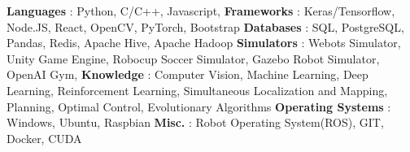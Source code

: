\begin{cventries}  
\skillentry
    {
    \space \textbf{Languages} : Python, C/C++, Javascript, 
    \space \textbf{Frameworks} : Keras/Tensorflow, Node.JS, React, OpenCV, PyTorch, Bootstrap
    \space \textbf{Databases} : SQL, PostgreSQL, Pandas, Redis, Apache Hive, Apache Hadoop
    \space \textbf{Simulators} : Webots Simulator, Unity Game Engine, Robocup Soccer Simulator, Gazebo Robot Simulator, OpenAI Gym,
    \space \textbf{Knowledge} : Computer Vision, Machine Learning, Deep Learning, Reinforcement Learning, Simultaneous Localization and Mapping, Planning, Optimal Control, Evolutionary Algorithms
    \space \textbf{Operating Systems} : Windows, Ubuntu, Raspbian 
    \space \textbf{Misc.} : Robot Operating System(ROS), GIT, Docker, CUDA
    }
    

\end{cventries}
\vspace{0.5 cm}